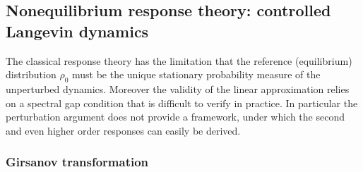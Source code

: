 \documentclass[]{tMPH2e}
\begin{document}

\subsection{Nonequilibrium response theory: controlled Langevin dynamics}

The classical response theory has the limitation that the reference (equilibrium) distribution $\rho_{0}$ must be the unique stationary probability measure of the unperturbed dynamics. Moreover the validity of the linear approximation relies on a spectral gap condition that is difficult to verify in practice. In particular the perturbation argument does not provide a framework, under which the second and even higher order responses can easily be derived. 

\subsubsection*{Girsanov transformation}
\end{document}
